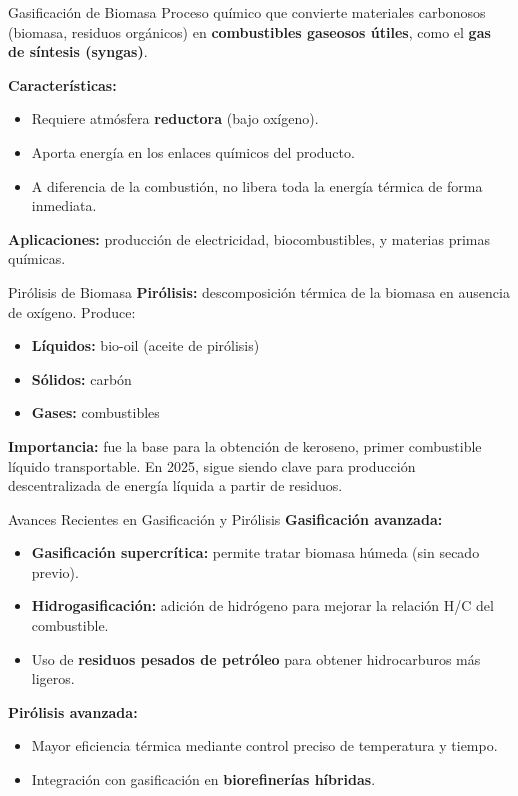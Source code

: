 \documentclass[../../main.tex]{subfiles}
\begin{document}
\begin{frame}{Gasificación de Biomasa}
\justifying
Proceso químico que convierte materiales carbonosos (biomasa, residuos orgánicos) en \textbf{combustibles gaseosos útiles}, como el \textbf{gas de síntesis (syngas)}.

\vspace{0.5em}
\textbf{Características:}
\begin{itemize}
  \item Requiere atmósfera \textbf{reductora} (bajo oxígeno).
  \item Aporta energía en los enlaces químicos del producto.
  \item A diferencia de la combustión, no libera toda la energía térmica de forma inmediata.
\end{itemize}

\textbf{Aplicaciones:} producción de electricidad, biocombustibles, y materias primas químicas.
\end{frame}

\begin{frame}{Pirólisis de Biomasa}
\justifying
\textbf{Pirólisis:} descomposición térmica de la biomasa en ausencia de oxígeno. Produce:
\begin{itemize}
  \item \textbf{Líquidos:} bio-oil (aceite de pirólisis)
  \item \textbf{Sólidos:} carbón
  \item \textbf{Gases:} combustibles
\end{itemize}

\vspace{0.5em}
\textbf{Importancia:} fue la base para la obtención de keroseno, primer combustible líquido transportable. En 2025, sigue siendo clave para producción descentralizada de energía líquida a partir de residuos.
\end{frame}

\begin{frame}{Avances Recientes en Gasificación y Pirólisis}
\justifying
\textbf{Gasificación avanzada:}
\begin{itemize}
  \item \textbf{Gasificación supercrítica:} permite tratar biomasa húmeda (sin secado previo).
  \item \textbf{Hidrogasificación:} adición de hidrógeno para mejorar la relación H/C del combustible.
  \item Uso de \textbf{residuos pesados de petróleo} para obtener hidrocarburos más ligeros.
\end{itemize}

\textbf{Pirólisis avanzada:}
\begin{itemize}
  \item Mayor eficiencia térmica mediante control preciso de temperatura y tiempo.
  \item Integración con gasificación en \textbf{biorefinerías híbridas}.
\end{itemize}
\end{frame}
\end{document}
